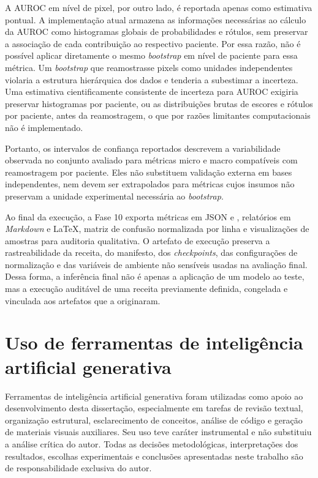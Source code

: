 A AUROC em nível de pixel, por outro lado, é reportada apenas como estimativa
pontual. A implementação atual armazena as informações necessárias ao cálculo da
AUROC como histogramas globais de probabilidades e rótulos, sem preservar a
associação de cada contribuição ao respectivo paciente. Por essa razão, não é
possível aplicar diretamente o mesmo \textit{bootstrap} em nível de paciente para
essa métrica. Um \textit{bootstrap} que reamostrasse pixels como unidades independentes violaria a estrutura hierárquica dos dados e tenderia a subestimar a incerteza. Uma estimativa cientificamente consistente de
incerteza para AUROC exigiria preservar histogramas por paciente, ou as
distribuições brutas de escores e rótulos por paciente, antes da reamostragem, o que por razões limitantes computacionais não é implementado.

Portanto, os intervalos de confiança reportados descrevem a variabilidade
observada no conjunto avaliado para métricas micro e macro compatíveis com
reamostragem por paciente. Eles não substituem validação externa em bases
independentes, nem devem ser extrapolados para métricas cujos insumos não
preservam a unidade experimental necessária ao \textit{bootstrap}.

Ao final da execução, a Fase 10 exporta métricas em JSON e , relatórios em
\textit{Markdown} e \LaTeX{}, matriz de confusão normalizada por linha e visualizações de
amostras para auditoria qualitativa. O artefato de execução preserva a
rastreabilidade da receita, do manifesto, dos \textit{checkpoints}, das
configurações de normalização e das variáveis de ambiente não sensíveis usadas
na avaliação final. Dessa forma, a inferência final não é apenas a aplicação de
um modelo ao teste, mas a execução auditável de uma receita previamente
definida, congelada e vinculada aos artefatos que a originaram.

\section{Uso de ferramentas de inteligência artificial generativa}
\label{sec:met_uso_ia}

Ferramentas de inteligência artificial generativa foram utilizadas como apoio ao
desenvolvimento desta dissertação, especialmente em tarefas de revisão textual,
organização estrutural, esclarecimento de conceitos, análise de código e
geração de materiais visuais auxiliares. Seu uso teve caráter instrumental e
não substituiu a análise crítica do autor. Todas as decisões metodológicas,
interpretações dos resultados, escolhas experimentais e conclusões apresentadas
neste trabalho são de responsabilidade exclusiva do autor.

